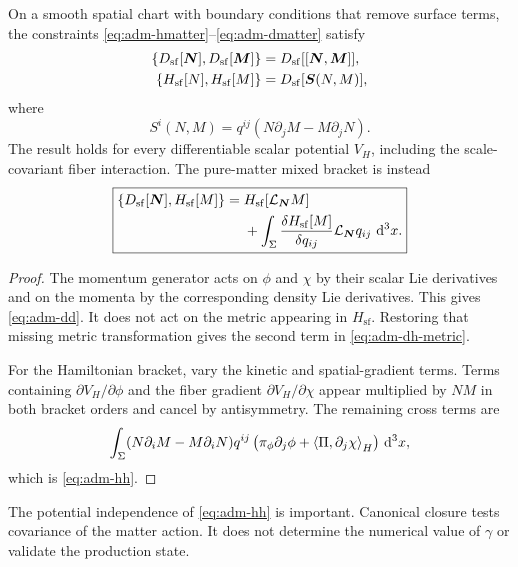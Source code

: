 \begin{theorem}
On a smooth spatial chart with boundary conditions that remove surface terms, the constraints \eqref{eq:adm-hmatter}--\eqref{eq:adm-dmatter} satisfy
\begin{align}
\left\{D_{\mathrm{sf}}[\bm N],D_{\mathrm{sf}}[\bm M]\right\}
&=D_{\mathrm{sf}}[[\bm N,\bm M]],
\label{eq:adm-dd}\\
\left\{H_{\mathrm{sf}}[N],H_{\mathrm{sf}}[M]\right\}
&=D_{\mathrm{sf}}[\bm S(N,M)],
\label{eq:adm-hh}
\end{align}
where
\begin{equation}
S^i(N,M)=q^{ij}(N\partial_jM-M\partial_jN).
\label{eq:adm-shift}
\end{equation}
The result holds for every differentiable scalar potential $V_H$, including the scale-covariant fiber interaction.  The pure-matter mixed bracket is instead
\begin{equation}
\boxed{
\begin{aligned}
\left\{D_{\mathrm{sf}}[\bm N],H_{\mathrm{sf}}[M]\right\}
={}&H_{\mathrm{sf}}[\mathcal L_{\bm N}M]\\
&+\int_\Sigma
\frac{\delta H_{\mathrm{sf}}[M]}{\delta q_{ij}}
\mathcal L_{\bm N}q_{ij}\,\,\mathrm d^3x.
\end{aligned}}
\label{eq:adm-dh-metric}
\end{equation}
\end{theorem}

\begin{proof}
The momentum generator acts on $\phi$ and $\chi$ by their scalar Lie derivatives and on the momenta by the corresponding density Lie derivatives.  This gives \eqref{eq:adm-dd}.  It does not act on the metric appearing in $H_{\mathrm{sf}}$.  Restoring that missing metric transformation gives the second term in \eqref{eq:adm-dh-metric}.

For the Hamiltonian bracket, vary the kinetic and spatial-gradient terms.  Terms containing $\partial V_H/\partial\phi$ and the fiber gradient $\partial V_H/\partial\chi$ appear multiplied by $NM$ in both bracket orders and cancel by antisymmetry.  The remaining cross terms are
\begin{equation}
\int_\Sigma
(N\partial_iM-M\partial_iN)q^{ij}
\left(
\pi_\phi\partial_j\phi+\left\langle \Pi,\partial_j\chi\right\rangle_H
\right)\,\mathrm d^3x,
\end{equation}
which is \eqref{eq:adm-hh}.
\end{proof}

The potential independence of \eqref{eq:adm-hh} is important.  Canonical closure tests covariance of the matter action.  It does not determine the numerical value of $\gamma$ or validate the production state.

